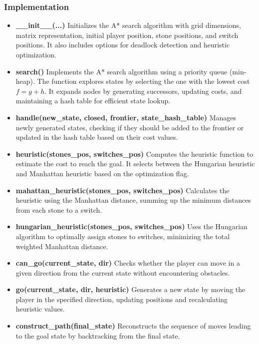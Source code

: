 \subsubsection{Implementation}
\begin{itemize}
    \item \textbf{\_\_init\_\_(...)}  
    Initializes the A* search algorithm with grid dimensions, matrix representation, initial player position, stone positions, and switch positions. It also includes options for deadlock detection and heuristic optimization.

    \item \textbf{search()}  
    Implements the A* search algorithm using a priority queue (min-heap). The function explores states by selecting the one with the lowest cost \(f = g + h\). It expands nodes by generating successors, updating costs, and maintaining a hash table for efficient state lookup.

    \item \textbf{handle(new\_state, closed, frontier, state\_hash\_table)}  
    Manages newly generated states, checking if they should be added to the frontier or updated in the hash table based on their cost values.

    \item \textbf{heuristic(stones\_pos, switches\_pos)}  
    Computes the heuristic function to estimate the cost to reach the goal. It selects between the Hungarian heuristic and Manhattan heuristic based on the optimization flag.

    \item \textbf{mahattan\_heuristic(stones\_pos, switches\_pos)}  
    Calculates the heuristic using the Manhattan distance, summing up the minimum distances from each stone to a switch.

    \item \textbf{hungarian\_heuristic(stones\_pos, switches\_pos)}  
    Uses the Hungarian algorithm to optimally assign stones to switches, minimizing the total weighted Manhattan distance.

    \item \textbf{can\_go(current\_state, dir)}  
    Checks whether the player can move in a given direction from the current state without encountering obstacles.

    \item \textbf{go(current\_state, dir, heuristic)}  
    Generates a new state by moving the player in the specified direction, updating positions and recalculating heuristic values.

    \item \textbf{construct\_path(final\_state)}  
    Reconstructs the sequence of moves leading to the goal state by backtracking from the final state.

\end{itemize}

